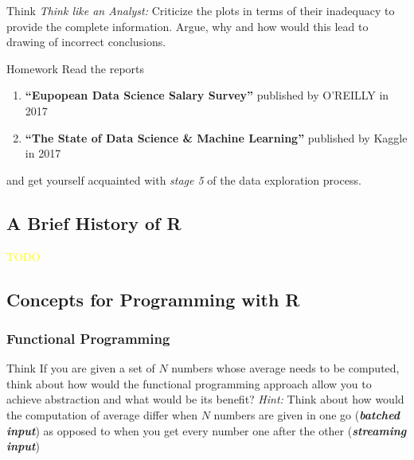 \begin{DIY}{Think}
\emph{Think like an Analyst:} Criticize the plots in terms of their inadequacy to provide the complete information. Argue, why and how would this lead to drawing of incorrect conclusions. 
\end{DIY}

\begin{DIY}{Homework}
Read the reports
\begin{enumerate}
  \item \textbf{``Eupopean Data Science Salary Survey''} published by O'REILLY in 2017
  \item \textbf{``The State of Data Science \& Machine Learning''} published by Kaggle in 2017
\end{enumerate}
and get yourself acquainted with \emph{stage 5} of the data exploration process.
\end{DIY}

\subsection{A Brief History of R}
\textcolor{yellow}{TODO}
\subsection{Concepts for Programming with R}
\subsubsection{Functional Programming}
\begin{HIGHLIGHT}
\par{}
\end{HIGHLIGHT}

\begin{DIY}{Think}
If you are given a set of $N$ numbers whose average needs to be computed, think about how would the functional programming approach allow you to achieve abstraction and what would be its benefit?
\emph{Hint:} Think about how would the computation of average differ when $N$ numbers are given in one go (\textbf{\emph{batched input}}) as opposed to when you get every number one after the other (\textbf{\emph{streaming input}})
\end{DIY}

